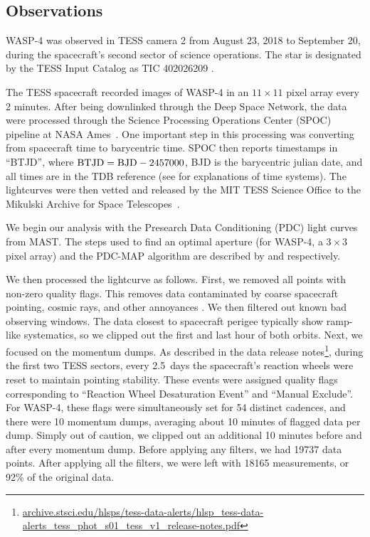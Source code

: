 \documentclass[12pt,twocolumn,tighten]{aastex62}
\begin{document}
\subsection{Observations}
\label{sec:observations}

WASP-4 was observed in TESS camera 2 from August 23, 2018 to September
20, during the spacecraft's second sector of science operations.  The
star is designated by the TESS Input Catalog as TIC 402026209
\citep{stassun_TIC_2018}.

The TESS spacecraft recorded images of WASP-4 in an $11\times11$ pixel
array every 2 minutes.   After being downlinked through the Deep Space
Network, the data were processed through the Science Processing
Operations Center (SPOC) pipeline at NASA
Ames~\citep{jenkins_tess_2016}.  One important step in this processing
was converting from spacecraft time to barycentric time.  SPOC then
reports timestamps in ``BTJD'', where ${\rm BTJD} = {\rm BJD} -
2457000$, BJD is the barycentric julian date, and all times are in the
TDB reference (see \citealt{urban_explanatory_2012} for explanations
of time systems).  The lightcurves were then vetted and released by
the MIT TESS Science Office to the Mikulski Archive for Space
Telescopes~\citep{ricker_tess_alerts_2018}.

We begin our analysis with the Presearch Data Conditioning (PDC) light
curves from MAST.  The steps used to find an optimal aperture (for
WASP-4, a $3\times 3$ pixel array) and the PDC-MAP algorithm are
described by \citet{smith_kepler_apertures_2017} and
\citet{smith_kepler_PDC_2017} respectively.

We then processed the lightcurve as follows.  First, we removed all
points with non-zero quality flags.  This removes data contaminated by
coarse spacecraft pointing, cosmic rays, and other annoyances
\citep{tess_data_product_description_2018}.  We then filtered out
known bad observing windows.  The data closest to spacecraft perigee
typically show ramp-like systematics, so we clipped out the first and
last hour of both orbits.  Next, we focused on the momentum dumps. As
described in the data release
notes\footnote{\url{archive.stsci.edu/hlsps/tess-data-alerts/hlsp_tess-data-alerts_tess_phot_s01_tess_v1_release-notes.pdf}},
during the first two TESS sectors, every 2.5~days the spacecraft's
reaction wheels were reset to maintain pointing stability.  These
events were assigned quality flags corresponding to ``Reaction Wheel
Desaturation Event'' and ``Manual Exclude''.  For WASP-4, these flags
were simultaneously set for 54 distinct cadences, and there were 10
momentum dumps, averaging about 10 minutes of flagged data per dump.
Simply out of caution, we clipped out an additional 10 minutes before
and after every momentum dump.  Before applying any filters, we had
19737 data points. After applying all the filters, we were left with
18165 measurements, or 92\% of the original data.
\end{document}
